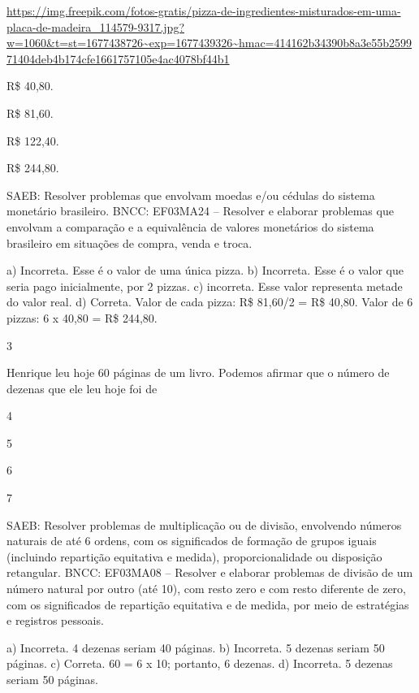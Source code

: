 \begin{multicols}{2}
\begin{enumerate}
{\url{https://img.freepik.com/fotos-gratis/pizza-de-ingredientes-misturados-em-uma-placa-de-madeira_114579-9317.jpg?w=1060\&t=st=1677438726~exp=1677439326~hmac=414162b34390b8a3e55b259971404deb4b174cfe1661757105e4ac4078bf44b1}

\begin{escolha}

\item
  R\$ 40,80.
\item
  R\$ 81,60.
\item
  R\$ 122,40.
\item
  R\$ 244,80.
\end{escolha}

SAEB: Resolver problemas que envolvam moedas e/ou cédulas do sistema monetário brasileiro.
BNCC: EF03MA24 -- Resolver e elaborar problemas que envolvam a comparação e a equivalência de
valores monetários do sistema brasileiro em situações de compra, venda e troca.

a) Incorreta. Esse é o valor de uma única pizza.
b) Incorreta. Esse é o valor que seria pago inicialmente, por 2 pizzas.
c) incorreta. Esse valor representa metade do valor real.
d) Correta. Valor de cada pizza: R\$ 81,60/2 = R\$ 40,80. Valor de 6 pizzas: 6 x 40,80 = R\$ 244,80.

\num{3}

Henrique leu hoje 60 páginas de um livro. Podemos afirmar que o número de dezenas que ele leu hoje foi de

\begin{escolha}

\item
  4
\item
  5
\item
  6
\item
  7
\end{escolha}

SAEB: Resolver problemas de multiplicação ou de divisão, envolvendo números naturais de até 6 ordens, com os significados de formação de grupos iguais (incluindo repartição equitativa e medida),
proporcionalidade ou disposição retangular.
BNCC: EF03MA08 -- Resolver e elaborar problemas de divisão de um número natural por outro (até
10), com resto zero e com resto diferente de zero, com os significados de repartição equitativa
e de medida, por meio de estratégias e registros pessoais.

a) Incorreta. 4 dezenas seriam 40 páginas.
b) Incorreta. 5 dezenas seriam 50 páginas.
c) Correta. 60 = 6 x 10; portanto, 6 dezenas.
d) Incorreta. 5 dezenas seriam 50 páginas.

}
\end{enumerate}
\end{multicols}
